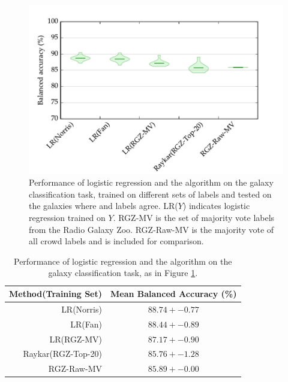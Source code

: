   \begin{figure}
    \centering
    \includegraphics[width=\textwidth]{images/experiments/predictors.pdf}
    \caption{Performance of logistic regression and the \citeauthor{raykar10}
      algorithm on the galaxy classification task, trained on different sets of
      labels and tested on the galaxies where \citeauthor{norris06} and
      \citeauthor{fan15} labels agree. LR($Y$) indicates logistic regression
      trained on $Y$. RGZ-MV is the set of majority vote labels from the Radio
      Galaxy Zoo. RGZ-Raw-MV is the majority vote of all crowd labels and is
      included for comparison.}
    \label{fig:predictors}
  \end{figure}

  \begin{table}
    \centering
    \begin{tabular}{r|c}
      \textbf{Method(Training Set)} & \textbf{Mean Balanced Accuracy (\%)}\\\hline
      LR(Norris) & $88.74 +- 0.77$\\
      LR(Fan) & $88.44 +- 0.89$\\
      LR(RGZ-MV) & $87.17 +- 0.90$\\
      Raykar(RGZ-Top-20) & $85.76 +- 1.28$\\
      RGZ-Raw-MV & $85.89 +- 0.00$\\
    \end{tabular}
    \caption{Performance of logistic regression and the \citeauthor{raykar10}
      algorithm on the galaxy classification task, as in Figure
      \ref{fig:predictors}.}
    \label{tab:predictors}
  \end{table}

